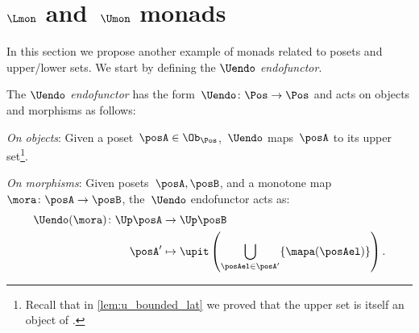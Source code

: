 %
%

\section{$\Lmon$ and~$\Umon$ monads}
In this section we propose another example of monads related to posets and upper/lower sets. We start by defining the \emph{$\Uendo$ endofunctor}.
\begin{definition}
  \label{def:Uendo}
  The \emph{$\Uendo$ endofunctor} has the form~$\Uendo \colon \Pos \to \Pos$ and acts on objects and morphisms as follows:
  \begin{compactenum}
    \item \emph{On objects}: Given a poset~$\posA \in \Ob_\Pos$,~$\Uendo$ maps~$\posA$ to its upper set\footnote{Recall that in \cref{lem:u_bounded_lat} we proved that the upper set is itself an object of \Pos.}.
    \item \emph{On morphisms}: Given posets~$\posA,\posB$, and a monotone map~$\mora \colon \posA\to \posB$, the~$\Uendo$ endofunctor acts as:
    \begin{equation}
      \begin{aligned}
        \Uendo(\mora)\colon \Up \posA&\to \Up \posB\\
        \posA'&\mapsto \upit \left( \bigcup_{\posAel\in \posA'} \{\mapa(\posAel)\}\right).
      \end{aligned}
    \end{equation}
  \end{compactenum}
\end{definition}

